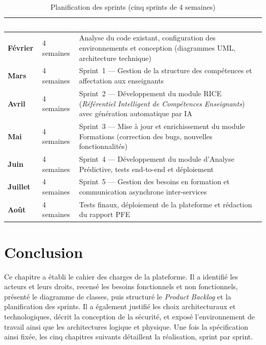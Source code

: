 \documentclass[12pt,a4paper]{report}
\renewcommand{\thead}[1]{\cellcolor{espritblue}\textcolor{white}{\textbf{#1}}}
\begin{document}
\begin{table}[H]
\centering
\caption{Planification des sprints (cinq sprints de 4 semaines)}
\label{tab:sprints}
{\small\renewcommand{\arraystretch}{1.15}
\begin{tabularx}{\textwidth}{>{\bfseries}p{2.5cm} p{2cm} X}
\toprule
\thead{Période} & \thead{Durée} & \thead{Périmètre fonctionnel} \\
\midrule
Février & 4 semaines & Analyse du code existant, configuration des environnements et conception (diagrammes UML, architecture technique) \\
Mars & 4 semaines & Sprint~1 — Gestion de la structure des compétences et affectation aux enseignants \\
Avril & 4 semaines & Sprint~2 — Développement du module RICE (\textit{Référentiel Intelligent de Compétences Enseignants}) avec génération automatique par IA \\
Mai & 4 semaines & Sprint~3 — Mise à jour et enrichissement du module Formations (correction des bugs, nouvelles fonctionnalités) \\
Juin & 4 semaines & Sprint~4 — Développement du module d'Analyse Prédictive, tests end-to-end et déploiement \\
Juillet & 4 semaines & Sprint~5 — Gestion des besoins en formation et communication asynchrone inter-services \\
Août & 4 semaines & Tests finaux, déploiement de la plateforme et rédaction du rapport PFE \\
\bottomrule
\end{tabularx}}
\end{table}

\section{Conclusion}

Ce chapitre a établi le cahier des charges de la plateforme. Il a identifié les
acteurs et leurs droits, recensé les besoins fonctionnels et non fonctionnels,
présenté le diagramme de classes, puis structuré le \textit{Product Backlog} et la
planification des sprints. Il a également justifié les choix architecturaux et
technologiques, décrit la conception de la sécurité, et exposé l'environnement de
travail ainsi que les architectures logique et physique. Une fois la spécification
ainsi fixée, les cinq chapitres suivants détaillent la réalisation, sprint par
sprint.

\clearpage
\end{document}
